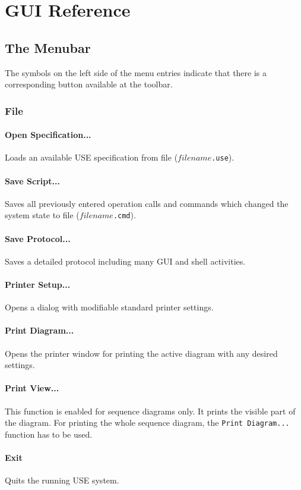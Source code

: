 \documentclass[a4paper,titlepage,oneside,final]{scrreprt} %
\begin{document}
\chapter{GUI Reference}
\section{The Menubar}
The symbols on the left side of the menu  entries indicate that there is a corresponding button
available at the toolbar.
\subsection{File}
\subsubsection{Open Specification...}\label{openSpec}
Loads an available USE specification from file ($\mathit{filename}$\verb+.use+).
\subsubsection{Save Script...}
Saves all previously entered operation calls and
commands which changed the system state to file ($\mathit{filename}$\verb+.cmd+).
\subsubsection{Save Protocol...}
Saves a detailed protocol including many GUI and shell activities.
\subsubsection{Printer Setup...}
Opens a dialog with modifiable standard printer settings.
\subsubsection{Print Diagram...}\label{printDia}
Opens the printer window for printing the active diagram
with any desired settings.
\subsubsection{Print View...}\label{printView}
This function is enabled for sequence diagrams only.
It prints the visible part of the diagram.
For printing the whole sequence diagram, the
\verb+Print Diagram...+ function has to be used.
\subsubsection{Exit}
Quits the running USE system.
\end{document}

